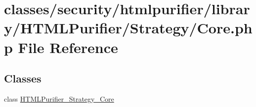 \hypertarget{Core_8php}{\section{classes/security/htmlpurifier/library/\+H\+T\+M\+L\+Purifier/\+Strategy/\+Core.php File Reference}
\label{Core_8php}
}
\subsection*{Classes}
\begin{DoxyCompactItemize}
\item 
class \hyperlink{classHTMLPurifier__Strategy__Core}{H\+T\+M\+L\+Purifier\+\_\+\+Strategy\+\_\+\+Core}
\end{DoxyCompactItemize}
